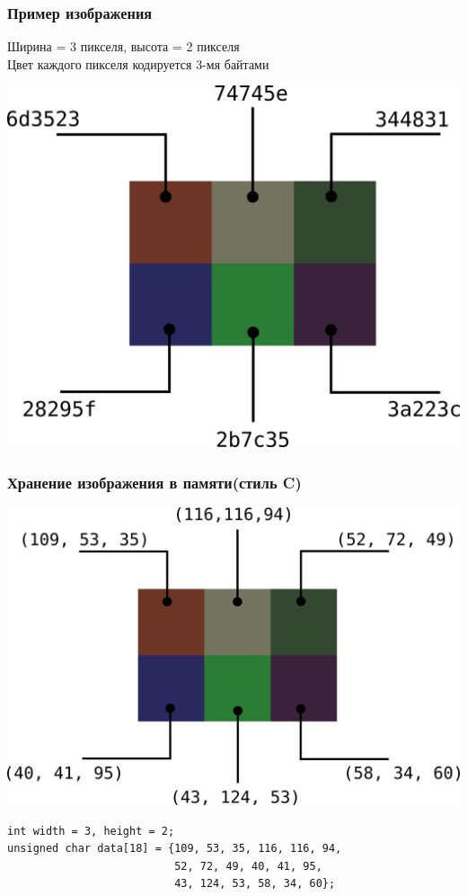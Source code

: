 \documentclass[10pt,pdf,hyperref={unicode}]{beamer}
\begin{document}
\begin{frame}[fragile]
\frametitle{Пример изображения}
Ширина = 3 пикселя, высота = 2 пикселя\\
Цвет каждого пикселя кодируется 3-мя байтами\\
\begin{center}
\includegraphics[scale=0.65]{./images/tiny_new_wn_hex.png}
\end{center}
\end{frame}


\begin{frame}[fragile]
\frametitle{Хранение изображения в памяти(стиль C)} 

\begin{center}
\includegraphics[scale=0.55]{./images/tiny_new_wn.png}
\end{center}

\begin{lstlisting}
int width = 3, height = 2;
unsigned char data[18] = {109, 53, 35, 116, 116, 94, 
                          52, 72, 49, 40, 41, 95,
                          43, 124, 53, 58, 34, 60};
\end{lstlisting}
\end{frame}
\end{document}

